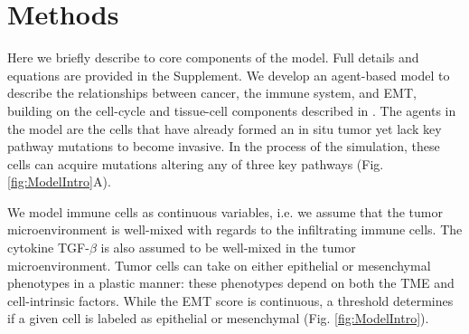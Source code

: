 \documentclass[11pt]{article}
\begin{document}



\section{Methods}
Here we briefly describe to core components of the model. Full details and equations are provided in the Supplement. We develop an agent-based model to describe the relationships between cancer, the immune system, and EMT, building on the cell-cycle and tissue-cell components described in \cite{guo17_multiscale}. 
The agents in the model are the cells that have already formed an in situ tumor yet lack key pathway mutations to become invasive.
In the process of the simulation, these cells can acquire mutations altering any of three key pathways (Fig. \ref{fig:ModelIntro}A).
\par
We model immune cells as continuous variables, i.e. we assume that the tumor microenvironment is well-mixed with regards to the infiltrating immune cells.
The cytokine TGF-$\beta$ is also assumed to be well-mixed in the tumor microenvironment.
Tumor cells can take on either epithelial or mesenchymal phenotypes in a plastic manner: these phenotypes depend on both the TME and cell-intrinsic factors.
While the EMT score is continuous, a threshold determines if a given cell is labeled as epithelial or mesenchymal (Fig. \ref{fig:ModelIntro}).
\end{document}
